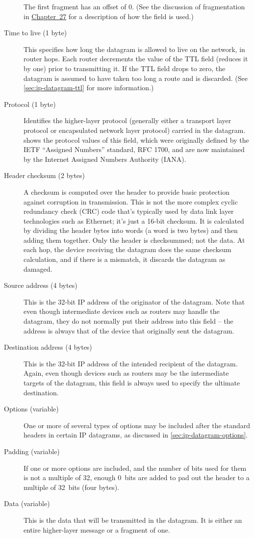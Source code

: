 \begin{description}
   The first fragment has an offset of 0.
   (See the discussion of fragmentation in \protect\hyperlink{ch27.html}{Chapter~27} for a description of how the field is used.)
\item[Time to live (1 byte)]
   This specifies how long the datagram is allowed to live on the network, in router hops.
   Each router decrements the value of the TTL field (reduces it by one) prior to transmitting it.
   If the TTL field drops to zero, the datagram is assumed to have taken too long a route and is discarded.
   (See \vref{sec:ip-datagram-ttl} for more information.)
\item[Protocol (1 byte)]
   Identifies the higher-layer protocol (generally either a transport layer protocol or encapsulated network layer protocol) carried in the datagram.
    shows the protocol values of this field, which were originally defined by the IETF ``Assigned Numbers'' standard,
   RFC 1700, and are now maintained by the Internet Assigned Numbers Authority (IANA).
\item[Header checksum (2 bytes)]
   A checksum is computed over the header to provide basic protection against corruption in transmission.
   This is not the more complex cyclic redundancy check (CRC) code that's typically used by data link layer technologies such as Ethernet;
   it's just a 16-bit checksum.
   It is calculated by dividing the header bytes into words (a word is two bytes) and then adding them together.
   Only the header is checksummed; not the data.
   At each hop, the device receiving the datagram does the same checksum calculation, and if there is a mismatch, it discards the datagram as damaged.
\item[Source address (4 bytes)]
   This is the 32-bit IP address of the originator of the datagram.
   Note that even though intermediate devices such as routers may handle the datagram, they do not normally put their address into this field -- the address is always that of the device that originally sent the datagram.
\item[Destination address (4 bytes)]
   This is the 32-bit IP address of the intended recipient of the datagram.
   Again, even though devices such as routers may be the intermediate targets of the datagram, this field is always used to specify the ultimate destination.
\item[Options (variable)]
   One or more of several types of options may be included after the standard headers in certain IP datagrams, as discussed in \vref{sec:ip-datagram-options}.
\item[Padding (variable)]
   If one or more options are included, and the number of bits used for them is not a multiple of 32, enough 0~bits are added to pad out the header to a multiple of 32~bits (four bytes).
\item[Data (variable)]
   This is the data that will be transmitted in the datagram.
   It is either an entire higher-layer message or a fragment of one.
\end{description}


